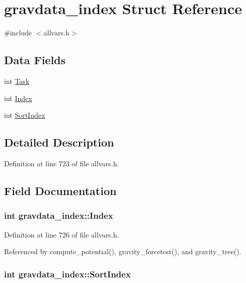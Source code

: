 \hypertarget{structgravdata__index}{
\section{gravdata\_\-index Struct Reference}
\label{structgravdata__index}
}


{\ttfamily \#include $<$allvars.h$>$}

\subsection*{Data Fields}
\begin{DoxyCompactItemize}
\item 
int \hyperlink{structgravdata__index_afacf7009bcd9677cf8ddff3dc927d6c5}{Task}
\item 
int \hyperlink{structgravdata__index_aac6e682d48cdd924a09384b4551b678e}{Index}
\item 
int \hyperlink{structgravdata__index_a34600f886624e73eb38845cb5d51d04c}{SortIndex}
\end{DoxyCompactItemize}


\subsection{Detailed Description}


Definition at line 723 of file allvars.h.



\subsection{Field Documentation}
\hypertarget{structgravdata__index_aac6e682d48cdd924a09384b4551b678e}{
\subsubsection[{Index}]{\setlength{\rightskip}{0pt plus 5cm}int {\bf gravdata\_\-index::Index}}}
\label{structgravdata__index_aac6e682d48cdd924a09384b4551b678e}


Definition at line 726 of file allvars.h.



Referenced by compute\_\-potential(), gravity\_\-forcetest(), and gravity\_\-tree().

\hypertarget{structgravdata__index_a34600f886624e73eb38845cb5d51d04c}{
\subsubsection[{SortIndex}]{\setlength{\rightskip}{0pt plus 5cm}int {\bf gravdata\_\-index::SortIndex}}}
\label{structgravdata__index_a34600f886624e73eb38845cb5d51d04c}


